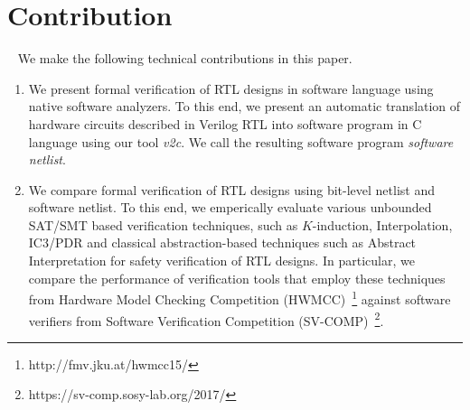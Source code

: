 \section{Contribution}~\label{contribution}
We make the following technical contributions in this paper.
%
\begin{enumerate}
\item We present formal verification of RTL designs in software language 
using native software analyzers.  To this end, we present an automatic 
translation of hardware circuits described in Verilog RTL into software 
program in C language using our tool \emph{v2c}.  We call the resulting 
software program {\em software netlist}.  

\item We compare formal verification of RTL designs 
using bit-level netlist and software netlist.  
To this end, we emperically evaluate various unbounded SAT/SMT based verification techniques, 
such as $K$-induction, Interpolation, IC3/PDR and classical abstraction-based 
techniques such as Abstract Interpretation for safety verification of RTL designs.  
%    
In particular, we compare the performance of verification 
tools that employ these techniques from Hardware Model Checking Competition 
(HWMCC)~\footnote{http://fmv.jku.at/hwmcc15/} against software verifiers from Software 
Verification Competition (SV-COMP)~\footnote{https://sv-comp.sosy-lab.org/2017/}.


\end{enumerate}
